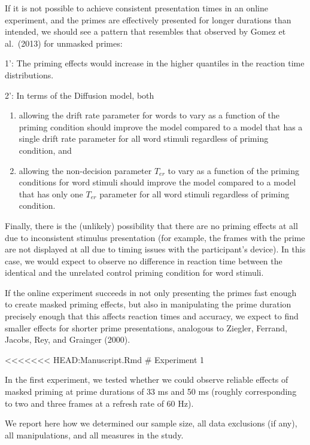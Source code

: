 \documentclass[
  english,
  man]{apa6}
\begin{document}
If it is not possible to achieve consistent presentation times in an online experiment, and the primes are effectively presented for longer durations than intended, we should see a pattern that resembles that observed by Gomez et al.~(2013) for unmasked primes:

1': The priming effects would increase in the higher quantiles in the reaction time distributions.

2': In terms of the Diffusion model, both

\begin{enumerate}
\def\labelenumi{\alph{enumi})}
\item
  allowing the drift rate parameter for words to vary as a function of the priming condition should improve the model compared to a model that has a single drift rate parameter for all word stimuli regardless of priming condition, and
\item
  allowing the non-decision parameter \(T_{er}\) to vary as a function of the priming conditions for word stimuli should improve the model compared to a model that has only one \(T_{er}\) parameter for all word stimuli regardless of priming condition.
\end{enumerate}

Finally, there is the (unlikely) possibility that there are no priming effects at all due to inconsistent stimulus presentation (for example, the frames with the prime are not displayed at all due to timing issues with the participant's device). In this case, we would expect to observe no difference in reaction time between the identical and the unrelated control priming condition for word stimuli.

If the online experiment succeeds in not only presenting the primes fast enough to create masked priming effects, but also in manipulating the prime duration precisely enough that this affects reaction times and accuracy, we expect to find smaller effects for shorter prime presentations, analogous to Ziegler, Ferrand, Jacobs, Rey, and Grainger (2000).

\textless\textless\textless\textless\textless\textless\textless{} HEAD:Manuscript.Rmd
\# Experiment 1

In the first experiment, we tested whether we could observe reliable effects of masked priming at prime durations of 33 ms and 50 ms (roughly corresponding to two and three frames at a refresh rate of 60 Hz).

We report here how we determined our sample size, all data exclusions (if any), all manipulations, and all measures in the study.
\end{document}
